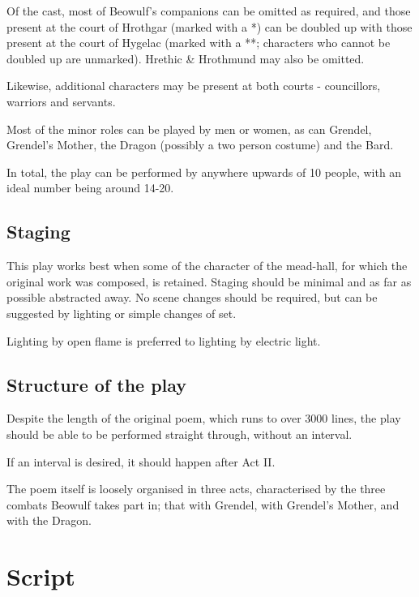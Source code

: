\documentclass[a4paper]{article}
\begin{document}
Of the cast, most of Beowulf's companions can be omitted as required, and those
present at the court of Hrothgar (marked with a  *) can be doubled up with those present at the court
of Hygelac (marked with a **; characters who cannot be doubled up are unmarked). Hrethic \& Hrothmund may also be omitted.

Likewise, additional characters may be present at both courts - councillors, warriors and servants.

Most of the minor roles can be played by men or women, as can Grendel, Grendel's
Mother, the Dragon (possibly a two person costume) and the Bard.

In total, the play can be performed by anywhere upwards of 10 people, with an ideal number being around 14-20.

\subsection{Staging}%

This play works best when some of the character of the mead-hall, for which the
original work was composed, is retained. Staging should be minimal and as far as
possible abstracted away. No scene changes should be required, but can be suggested 
by lighting or simple changes of set.

Lighting by open flame is preferred to lighting by electric light.

\subsection{Structure of the play}%

Despite the length of the original poem, which runs to over 3000 lines, the play
should be able to be performed straight through, without an interval.

If an interval is desired, it should happen after Act II.

The poem itself is loosely organised in three acts, characterised by the three 
combats Beowulf takes part in; that with Grendel, with Grendel's Mother, and with the Dragon.

\newpage

\section{Script}
\end{document}
